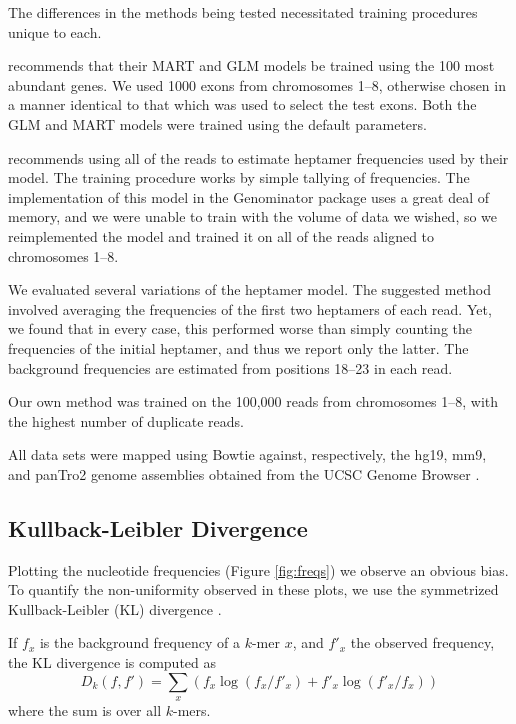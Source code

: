 \documentclass{bioinfo}
\begin{document}
The differences in the methods being tested necessitated training procedures
unique to each.

\citet{Li2010} recommends that their MART and GLM models be trained using the
100 most abundant genes. We used 1000 exons from chromosomes 1--8, otherwise
chosen in a manner identical to that which was used to select the test exons.
Both the GLM and MART models were trained using the default parameters.

\citet{Hansen2010} recommends using all of the reads to estimate heptamer
frequencies used by their model. The training procedure works by simple tallying
of frequencies. The implementation of this model in the Genominator package
uses a great deal of memory, and we were unable to train with the volume of
data we wished, so we reimplemented the model and trained it on all of the reads
aligned to chromosomes 1--8.

We evaluated several variations of the heptamer model. The suggested method
involved averaging the frequencies of the first two heptamers of each read. Yet,
we found that in every case, this performed worse than simply counting the
frequencies of the initial heptamer, and thus we report only the latter. The
background frequencies are estimated from positions 18--23 in each read.

Our own method was trained on the 100,000 reads from chromosomes 1--8, with the
highest number of duplicate reads.

All data sets were mapped using Bowtie \citep{Langmead2009} against,
respectively, the hg19, mm9, and panTro2 genome assemblies obtained from the
UCSC Genome Browser \citep{Karolchik2008}.



\subsection{Kullback-Leibler Divergence}



Plotting the nucleotide frequencies (Figure  \ref{fig:freqs}) we observe an
obvious bias. To quantify the non-uniformity observed in these plots, we use the
symmetrized Kullback-Leibler (KL) divergence \citep{Kullback1951}.

If $f_x$ is the background frequency of a $k$-mer $x$, and $f'_x$ the observed
frequency, the KL divergence is computed as
$$D_k( f, f' ) = \sum_{x} \left( f_x \log( f_x / f'_x ) + f'_x \log( f'_x / f_x) \right)$$
where the sum is over all $k$-mers.
\end{document}
